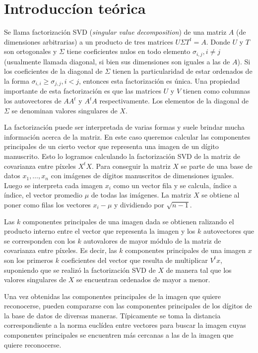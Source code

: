 \section{Introducc\'ion te\'orica}

	\PARstart Se llama factorizaci\'on SVD (\textit{singular value decomposition})
	de una matriz $A$ (de dimensiones arbitrarias) a un producto de tres matrices
	$U\Sigma T^{t} = A$. Donde $U$ y $T$ son ortogonales y $\Sigma$ tiene
	coeficientes nulos en todo elemento $\sigma_{i,j}, i\neq j$ (usualmente
	llamada diagonal, si bien sus dimensiones son iguales a las de $A$).
	Si los coeficientes de la diagonal de $\Sigma$ tienen
	la particularidad de estar ordenados de la forma $\sigma_{i,i} \geq
	\sigma_{j,j}, i<j$, entonces esta factorizaci\'on es \'unica.
	Una propiedad importante de esta factorizaci\'on es que las matrices
	$U$ y $V$ tienen como columnas los autovectores de $AA^t$ y $A^tA$
	respectivamente.
	Los elementos de la diagonal de $\Sigma$ se denominan valores singulares
	de $X$.

	La factorizaci\'on puede ser interpretada de varias formas y suele
	brindar mucha informaci\'on acerca de la matriz. En este caso queremos
	calcular las componentes principales de un cierto vector que representa
	una imagen de un d\'igito manuscrito. Esto lo logramos calculando la
	factorizaci\'on SVD de la matriz de covarianza entre p\'ixeles $X^tX$.
	Para conseguir la matriz $X$ se parte de una base de datos $x_1, \ldots, x_n$
	con im\'agenes
	de d\'igitos manuscritos de dimensiones iguales. Luego se interpreta cada
	imagen $x_i$ como un vector fila y se calcula, \'indice a \'indice,
	el vector promedio $\mu$ de todas las im\'agenes.
	La matriz $X$ se obtiene al poner como filas los vectores $x_i - \mu$
	y dividiendo por $\sqrt{n-1}$.

	Las $k$ componentes principales de una imagen dada se obtienen ralizando
	el producto interno entre el vector que representa la imagen y los
	$k$ autovectores que se corresponden con los $k$ autovalores de mayor m\'odulo
	de la matriz de covarianza entre p\'ixeles.
	Es decir, las $k$ componentes principales de una imagen $x$ son los
	primeros $k$ coeficientes del vector que resulta de multiplicar $V^tx$,
	suponiendo que se realiz\'o la factorizaci\'on SVD de $X$ de manera tal
	que los valores singulares de $X$ se encuentran ordenados de mayor a menor. 

	Una vez obtenidas las componentes principales de la imagen que quiere
	reconocerse, pueden compararse con las componentes principales de los
	d\'igitos de la base de datos de diversas maneras. T\'ipicamente se toma
	la distancia correspondiente a la norma eucl\'idea entre vectores para
	buscar la imagen cuyas componentes principales se encuentren m\'as cercanas
	a las de la imagen que quiere reconocerse.
